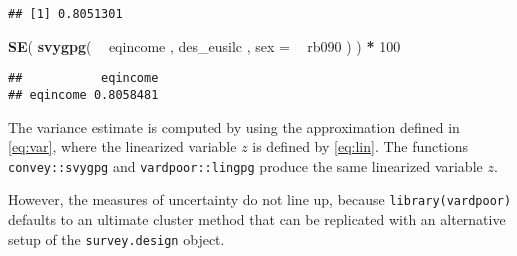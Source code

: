 \documentclass[]{book}
\newenvironment{Shaded}{\begin{snugshade}}{\end{snugshade}}
\newcommand{\CommentTok}[1]{\textcolor[rgb]{0.56,0.35,0.01}{\textit{#1}}}
\newcommand{\DataTypeTok}[1]{\textcolor[rgb]{0.13,0.29,0.53}{#1}}
\newcommand{\DecValTok}[1]{\textcolor[rgb]{0.00,0.00,0.81}{#1}}
\newcommand{\KeywordTok}[1]{\textcolor[rgb]{0.13,0.29,0.53}{\textbf{#1}}}
\newcommand{\NormalTok}[1]{#1}
\newcommand{\OperatorTok}[1]{\textcolor[rgb]{0.81,0.36,0.00}{\textbf{#1}}}
\newcommand{\StringTok}[1]{\textcolor[rgb]{0.31,0.60,0.02}{#1}}
\begin{document}
\begin{Shaded}
\end{Shaded}

\begin{verbatim}
## [1] 0.8051301
\end{verbatim}

\begin{Shaded}
\begin{Highlighting}[]
\KeywordTok{SE}\NormalTok{( }\KeywordTok{svygpg}\NormalTok{( }\OperatorTok{~}\StringTok{ }\NormalTok{eqincome , des_eusilc , }\DataTypeTok{sex =} \OperatorTok{~}\StringTok{ }\NormalTok{rb090 ) ) }\OperatorTok{*}\StringTok{ }\DecValTok{100}
\end{Highlighting}
\end{Shaded}

\begin{verbatim}
##           eqincome
## eqincome 0.8058481
\end{verbatim}

The variance estimate is computed by using the approximation defined in \eqref{eq:var}, where the linearized variable \(z\) is defined by \eqref{eq:lin}. The functions \texttt{convey::svygpg} and \texttt{vardpoor::lingpg} produce the same linearized variable \(z\).

However, the measures of uncertainty do not line up, because \texttt{library(vardpoor)} defaults to an ultimate cluster method that can be replicated with an alternative setup of the \texttt{survey.design} object.
\end{document}
